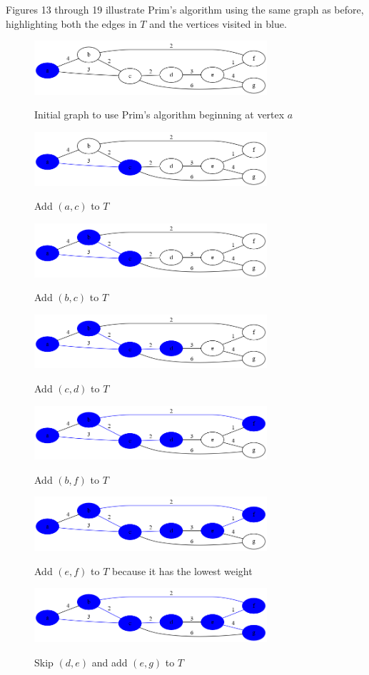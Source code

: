 \documentclass{book}
\begin{document}
Figures 13 through 19 illustrate Prim's algorithm using the same graph as before, highlighting both the edges in $T$ and the vertices visited in blue.

\begin{figure}[ht]
\centering
\includegraphics[width=3.4in]{ch-spann/prim1}
\label{prim1}
\caption{Initial graph to use Prim's algorithm beginning at vertex $a$}

\includegraphics[width=3.4in]{ch-spann/prim2}
\label{prim2}
\caption{Add $(a,c)$ to $T$}

\includegraphics[width=3.4in]{ch-spann/prim3}
\label{prim3}
\caption{Add $(b,c)$ to $T$}

\includegraphics[width=3.4in]{ch-spann/prim4}
\label{prim4}
\caption{Add $(c,d)$ to $T$}

\includegraphics[width=3.4in]{ch-spann/prim5}
\label{prim5}
\caption{Add $(b,f)$ to $T$}

\includegraphics[width=3.4in]{ch-spann/prim6}
\label{prim6}
\caption{Add $(e,f)$ to $T$ because it has the lowest weight}

\includegraphics[width=3.4in]{ch-spann/prim7}
\label{prim7}
\caption{Skip $(d,e)$ and add $(e,g)$ to $T$}
\end{figure}
\restoregeometry
\end{document}
